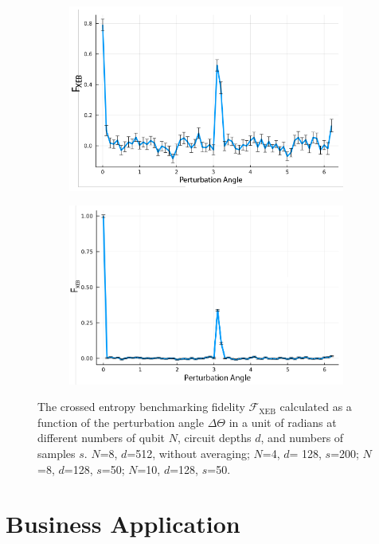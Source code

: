 \documentclass[12pt]{article}
\begin{document}
\begin{figure}
	\begin{subfigure}[t]{0.42\textwidth}
		\centering
		\includegraphics[width=\linewidth]
		{figures/task4b_N_8_d_128_s_50_fg}
		\subcaption{\label{fig:task4b_N8}}
	\end{subfigure}%
	\begin{subfigure}[t]{0.42\textwidth}
		\centering
		\includegraphics[width=\linewidth]
		{figures/Task4b_N_10_d_128_s_50_fg}
		\subcaption{\label{fig:task4b_N10}}
	\end{subfigure}%
	\caption{
		The crossed entropy benchmarking fidelity $\mathcal{F}_\mathrm{XEB}$ calculated as a function of the perturbation angle $\Delta \Theta$ in a unit of radians at different numbers of qubit $N$, circuit depths $d$, and numbers of samples $s$.  $N$=8, $d$=512, without averaging;  $N$=4, $d$= 128, $s$=200;  $N$=8, $d$=128, $s$=50;  $N$=10, $d$=128, $s$=50.
	}
	\label{fig:XEBfidelity}
\end{figure}

\section*{Business Application}
\end{document}
